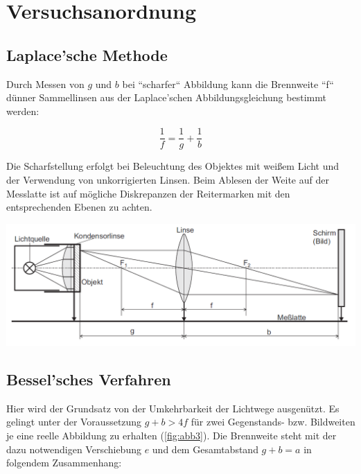 \documentclass[11pt,ngerman]{scrartcl}
\begin{document}
\newpage

\section{Versuchsanordnung}\label{sec:Versuchsanordnung}

\subsection{Laplace'sche Methode}

Durch Messen von $g$ und $b$ bei
``scharfer`` Abbildung kann die Brennweite ``f`` dünner Sammellinsen
aus der Laplace'schen Abbildungsgleichung bestimmt werden:

\begin{equation}
	\frac{1}{f} = \frac{1}{g} + \frac{1}{b}
\end{equation}

Die Scharfstellung erfolgt bei Beleuchtung des Objektes mit weißem Licht und der Verwendung
von unkorrigierten Linsen. Beim Ablesen der Weite auf der Messlatte ist auf mögliche Diskrepanzen
der Reitermarken mit den entsprechenden Ebenen zu achten.

\begin{center}
	\begin{minipage}[t]{\textwidth}
		\centering
		\includegraphics[width=\textwidth]{abb2}
		\label{fig:abb2}
	\end{minipage}
\end{center}

\vspace{5mm}

\subsection{Bessel'sches Verfahren}

Hier wird der Grundsatz von der Umkehrbarkeit der Lichtwege ausgenützt. Es gelingt unter
der Voraussetzung $g + b > 4f$ für zwei Gegenstands- bzw. Bildweiten je eine reelle Abbildung
zu erhalten (\autoref{fig:abb3}). Die Brennweite steht mit der dazu notwendigen Verschiebung $e$ und dem
Gesamtabstand $g + b = a$ in folgendem Zusammenhang:
\end{document}
